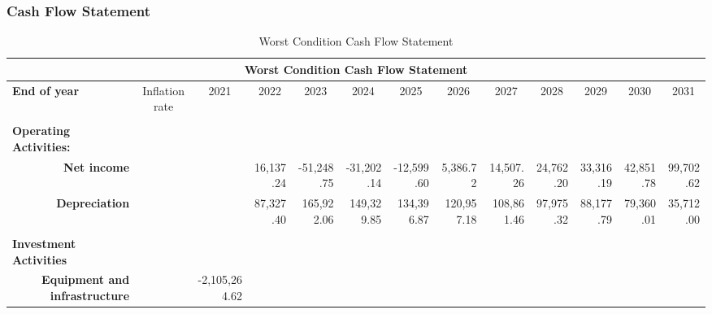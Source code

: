 \documentclass[12pt]{article}
\begin{document}
\begin{landscape}
\subsubsection{Cash Flow Statement}
\begin{table}[htbp]
\tiny
  \centering
  \caption{Worst Condition Cash Flow Statement}
    \begin{tabular}{|r|r|l|r|r|l|r|r|r|r|r|r|r|}
    \toprule
    \multicolumn{13}{|c|}{\textbf{Worst Condition Cash Flow Statement }} \\
    \hline
    \multicolumn{1}{|l|}{\textbf{End of year}} & \multicolumn{1}{c|}{Inflation rate } & \multicolumn{1}{c|}{2021} & \multicolumn{1}{c|}{2022} & \multicolumn{1}{c|}{2023} & \multicolumn{1}{c|}{2024} & \multicolumn{1}{c|}{2025} & \multicolumn{1}{c|}{2026} & \multicolumn{1}{c|}{2027} & \multicolumn{1}{c|}{2028} & \multicolumn{1}{c|}{2029} & \multicolumn{1}{c|}{2030} & \multicolumn{1}{c|}{2031} \\
    \hline
          &       &       &       &       &       &       &       &       &       &       &       &  \\
    \hline
    \multicolumn{1}{|l|}{\textbf{Operating Activities:}} &       &       &       &       &       &       &       &       &       &       &       &  \\
    \hline
    \textbf{              Net income} &       &       & 16,137.24 & \textcolor[rgb]{ 1,  0,  0}{-51,248.75} & \multicolumn{1}{r|}{\textcolor[rgb]{ 1,  0,  0}{-31,202.14}} & \textcolor[rgb]{ 1,  0,  0}{-12,599.60} & 5,386.72 & 14,507.26 & 24,762.20 & 33,316.19 & 42,851.78 & 99,702.62 \\
    \hline
    \textbf{              Depreciation} &       &       & 87,327.40 & 165,922.06 & \multicolumn{1}{r|}{149,329.85} & 134,396.87 & 120,957.18 & 108,861.46 & 97,975.32 & 88,177.79 & 79,360.01 & 35,712.00 \\
    \hline
          &       &       &       &       &       &       &       &       &       &       &       &  \\
    \hline
    \multicolumn{1}{|l|}{\textbf{Investment Activities        }} &       &       &       &       &       &       &       &       &       &       &       &  \\
    \hline
    \textbf{              Equipment and infrastructure} &       & \multicolumn{1}{r|}{\textcolor[rgb]{ 1,  0,  0}{-2,105,264.62}} &       &       &       &       &       &       &       &       &       &  \\

\end{tabular}
\end{table}
\end{landscape}
\end{document}
